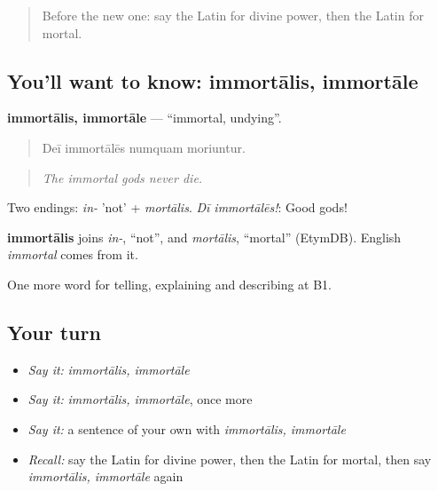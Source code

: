 \label{lesson:LA-C346-immortalis}



\begin{quote}
Before the new one: say the Latin for divine power, then the Latin for mortal.
\end{quote}

\subsection*{You'll want to know: immortālis, immortāle}
\textbf{immortālis, immortāle} — \textquotedblleft{}immortal, undying\textquotedblright{}.

\begin{quote}
Deī immortālēs numquam moriuntur.
\end{quote}

\begin{quote}
\emph{The immortal gods never die.}
\end{quote}

Two endings: \emph{in-} 'not' + \emph{mortālis}. \emph{Dī immortālēs!}: Good gods!

\begin{cousinweb}
\textbf{immortālis} joins \emph{in-}, \textquotedblleft{}not\textquotedblright{}, and \emph{mortālis}, \textquotedblleft{}mortal\textquotedblright{} (EtymDB). English \emph{immortal} comes from it.
\end{cousinweb}

\begin{grammarlens}[title={What you've built}]
One more word for telling, explaining and describing at B1.
\end{grammarlens}

\subsection*{Your turn}
\begin{itemize}
\raggedright
  \item \emph{Say it:} \emph{immortālis, immortāle}
  \item \emph{Say it:} \emph{immortālis, immortāle}, once more
  \item \emph{Say it:} a sentence of your own with \emph{immortālis, immortāle}
  \item \emph{Recall:} say the Latin for divine power, then the Latin for mortal, then say \emph{immortālis, immortāle} again
\end{itemize}

